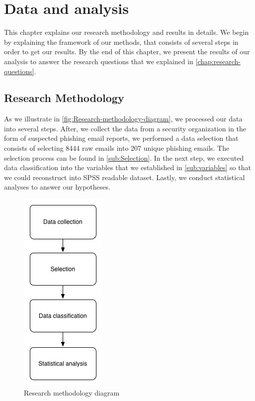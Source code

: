 %

\chapter{\label{chap:Data-and-analysis}Data and analysis}

This chapter explains our research methodology and results in details.
We begin by explaining the framework of our methods, that consists
of several steps in order to get our results. By the end of this chapter,
we present the results of our analysis to answer the research questions
that we explained in \autoref{chap:research-questions}.


\section{\label{sec:Research-Methodology}Research Methodology}

As we illustrate in \autoref{fig:Research-methodology-diagram}, we
processed our data into several steps. After, we collect the data
from a security organization in the form of suspected phishing email
reports, we performed a data selection that consists of selecting
8444 raw emails into 207 unique phishing emails. The selection process
can be found in \autoref{sub:Selection}. In the next step, we executed
data classification into the variables that we established in \autoref{sub:variables}
so that we could reconstruct into SPSS readable dataset. Lastly, we
conduct statistical analyses to answer our hypotheses.

\begin{figure}[H]
\begin{centering}
\includegraphics[scale=0.7]{gfx/methodology_diagram}\protect\caption{\label{fig:Research-methodology-diagram}Research methodology diagram}

\par\end{centering}

%
%
\end{figure}



